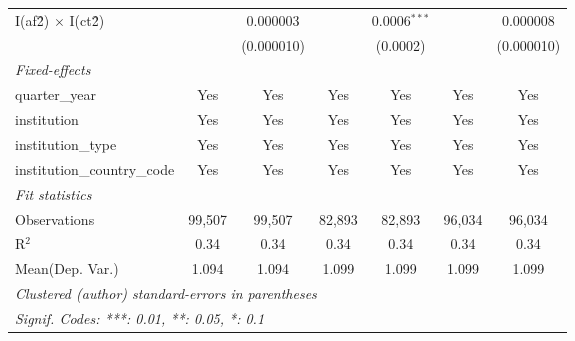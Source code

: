 \begin{tabular}{lcccccc}
   I(af\^2) $\times$ I(ct\^2)         &               & 0.000003       &               & 0.0006$^{***}$ &               & 0.000008\\   
                                      &               & (0.000010)     &               & (0.0002)       &               & (0.000010)\\   
   \midrule
   \emph{Fixed-effects}\\
   quarter\_year                      & Yes           & Yes            & Yes           & Yes            & Yes           & Yes\\  
   institution                        & Yes           & Yes            & Yes           & Yes            & Yes           & Yes\\  
   institution\_type                  & Yes           & Yes            & Yes           & Yes            & Yes           & Yes\\  
   institution\_country\_code         & Yes           & Yes            & Yes           & Yes            & Yes           & Yes\\  
   \midrule
   \emph{Fit statistics}\\
   Observations                       & 99,507        & 99,507         & 82,893        & 82,893         & 96,034        & 96,034\\  
   R$^2$                              & 0.34          & 0.34           & 0.34          & 0.34           & 0.34          & 0.34\\  
Mean(Dep. Var.) & 1.094 & 1.094 & 1.099 & 1.099 & 1.099 & 1.099 \\
   \midrule \midrule
   \multicolumn{7}{l}{\emph{Clustered (author) standard-errors in parentheses}}\\
   \multicolumn{7}{l}{\emph{Signif. Codes: ***: 0.01, **: 0.05, *: 0.1}}\\
\end{tabular}
\par\endgroup
